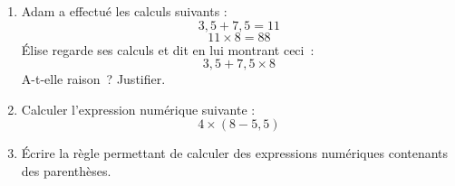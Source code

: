 \documentclass[activite]{thedocument}
\begin{document}
    \begin{enumerate}
        \item Adam a effectué les calculs suivants :
        $$3,5+7,5=11$$
        $$11\times8=88$$
        \'Elise regarde ses calculs et dit  en lui montrant ceci~:
        $$3,5+7,5\times8$$
        A-t-elle raison~? Justifier.
        \item Calculer l'expression numérique suivante :$$4\times(8-5,5)$$
        \item \'Ecrire la règle permettant de calculer des expressions
        numériques contenants des parenthèses.
        \dotedline\dotedline\dotedline
    \end{enumerate}
\end{document}
